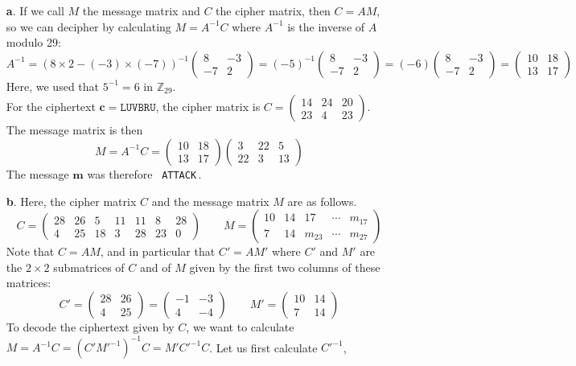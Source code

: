 \documentclass[11pt]{article}
\renewcommand{\vec}[1]{\mathbf{#1}}
\newcommand{\vc}[1]{\begin{pmatrix}#1\end{pmatrix}}
\begin{document}
\bigskip{}
\begin{itemize}
  \item[{\bf a}.]
    If we call $M$ the message matrix and $C$ the cipher matrix, then $C = AM$,
    so we can decipher by calculating $M = A^{-1}C$
    where $A^{-1}$ is the inverse of $A$ modulo 29:
    \[
        A^{-1}
      = (8\times2-(-3)\times(-7))^{-1}\vc{ 8 & -3\\
                                          -7 &  2}
      = (-5)^{-1}\vc{ 8 & -3\\
                     -7 &  2}
      = (-6)\vc{  8 &  -3\\
                 -7 &   2}
      =     \vc{ 10 &  18\\
                 13 &  17}
    \]
    Here, we used that $5^{-1} = 6$ in $\mathbb{Z}_{29}$.\\
    For the ciphertext $\vec{c} = \texttt{LUVBRU}$,
    the cipher matrix is $C = \vc{14 & 24 & 20\\
                                  23 &  4 & 23}$.
    The message matrix is then
    \[
      M = A^{-1}C
      =   \vc{10 & 18\\
              13 & 17}
          \vc{ 3 & 22 &  5\\
              22 &  3 & 13}
    \]
    The message $\vec{m}$ was therefore \, {\tt ATTACK}\,.
  \item[{\bf b}.]
    Here, the cipher matrix $C$ and the message matrix $M$ are as follows.
    \[
      C
        = \vc{28 & 26 &  5 & 11 & 11 &  8 & 28 \\
               4 & 25 & 18 &  3 & 28 & 23 &  0 }
      \qquad
      M
        = \vc{10 & 14 & 17    & \cdots & m_{17}\\
               7 & 14 & m_{23}& \cdots & m_{27}}
    \]
    Note that $C = AM$,
    and in particular that $C' = AM'$ where $C'$ and $M'$ are the
    $2\times 2$ submatrices of $C$ and of $M$ given by the first two columns
    of these matrices:
    \[
      C' = \vc{28 & 26\\
                4 & 25}
         = \vc{-1 & -3\\
                4 & -4}
      \qquad
      M' = \vc{10 & 14\\
                7 & 14}
    \]
    To decode the ciphertext given by $C$,
    we want to calculate $M = A^{-1}C = (C'M'^{-1})^{-1}C = M'C'^{-1}C$.
    Let us first calculate $C'^{-1}$,

\end{itemize}
\end{document}
